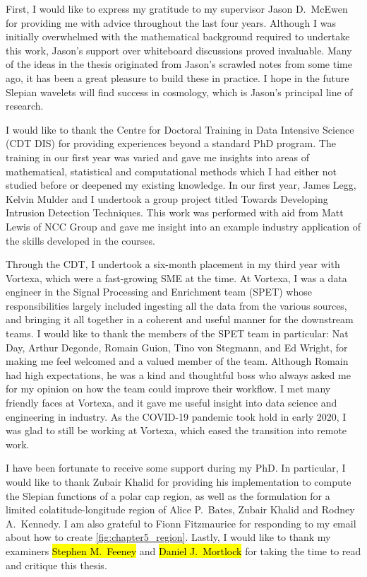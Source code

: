 \begin{acknowledgements}
	First, I would like to express my gratitude to my supervisor Jason D.~McEwen for providing me with advice throughout the last four years.
	Although I was initially overwhelmed with the mathematical background required to undertake this work, Jason's support over whiteboard discussions proved invaluable.
	Many of the ideas in the thesis originated from Jason's scrawled notes from some time ago, it has been a great pleasure to build these in practice.
	I hope in the future Slepian wavelets will find success in cosmology, which is Jason's principal line of research.

	I would like to thank the Centre for Doctoral Training in Data Intensive Science (CDT DIS) for providing experiences beyond a standard PhD program.
	The training in our first year was varied and gave me insights into areas of mathematical, statistical and computational methods which I had either not studied before or deepened my existing knowledge.
	In our first year, James Legg, Kelvin Mulder and I undertook a group project titled Towards Developing Intrusion Detection Techniques.
	This work was performed with aid from Matt Lewis of NCC Group and gave me insight into an example industry application of the skills developed in the courses.

	Through the CDT, I undertook a six-month placement in my third year with Vortexa, which were a fast-growing SME at the time.
	At Vortexa, I was a data engineer in the Signal Processing and Enrichment team (SPET) whose responsibilities largely included ingesting all the data from the various sources, and bringing it all together in a coherent and useful manner for the downstream teams.
	I would like to thank the members of the SPET team in particular: Nat Day, Arthur Degonde, Romain Guion, Tino von Stegmann, and Ed Wright, for making me feel welcomed and a valued member of the team.
	Although Romain had high expectations, he was a kind and thoughtful boss who always asked me for my opinion on how the team could improve their workflow.
	I met many friendly faces at Vortexa, and it gave me useful insight into data science and engineering in industry.
	As the COVID-19 pandemic took hold in early 2020, I was glad to still be working at Vortexa, which eased the transition into remote work.

	I have been fortunate to receive some support during my PhD.
	In particular, I would like to thank Zubair Khalid for providing his implementation to compute the Slepian functions of a polar cap region, as well as the formulation for a limited colatitude-longitude region of Alice P.~Bates, Zubair Khalid and Rodney A.~Kennedy.
	I am also grateful to Fionn Fitzmaurice for responding to my email about how to create \cref{fig:chapter5_region}.
	Lastly, I would like to thank my examiners \hl{Stephen M.~Feeney} and \hl{Daniel J.~Mortlock} for taking the time to read and critique this thesis.


\end{acknowledgements}
